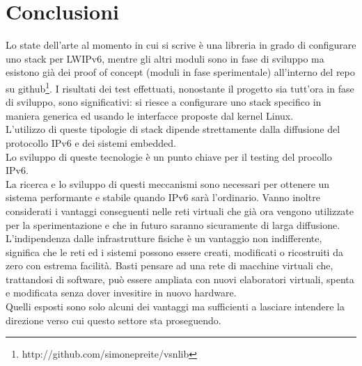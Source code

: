 
\chapter*{Conclusioni}
Lo state dell'arte al momento in cui si scrive \`e una libreria in grado di configurare uno stack per LWIPv6, mentre gli altri moduli sono in fase di sviluppo ma esistono gi\`a dei proof of concept (moduli in fase sperimentale) all'interno del repo su github\footnote{http://github.com/simonepreite/vsnlib}.
I risultati dei test effettuati, nonostante il progetto sia tutt'ora in fase di sviluppo, sono significativi: si riesce a configurare uno stack specifico in maniera generica ed usando le interfacce proposte dal kernel Linux.\\
L'utilizzo di queste tipologie di stack dipende strettamente dalla diffusione del protocollo IPv6 e dei sistemi embedded.\\
Lo sviluppo di queste tecnologie \`e un punto chiave per il testing del procollo IPv6.\\
La ricerca e lo sviluppo di questi meccanismi sono necessari per ottenere un sistema performante e stabile quando IPv6 sar\`a l'ordinario. Vanno inoltre considerati i vantaggi conseguenti nelle reti virtuali che gi\`a ora vengono utilizzate per la sperimentazione e che in futuro saranno sicuramente di larga diffusione.\\
L'indipendenza dalle infrastrutture fisiche \`e un vantaggio non indifferente, significa che le reti ed i sistemi possono essere creati, modificati o ricostruiti da zero con estrema facilit\`a. Basti pensare ad una rete di macchine virtuali che, trattandosi di software, pu\`o essere ampliata con nuovi elaboratori virtuali, spenta e modificata senza dover invesitire in nuovo hardware.\\
Quelli esposti sono solo alcuni dei vantaggi ma sufficienti a lasciare intendere la direzione verso cui questo settore sta proseguendo.
